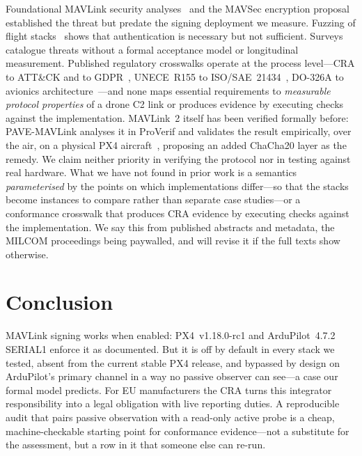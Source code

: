 \documentclass[conference]{IEEEtran}
\begin{document}
Foundational MAVLink security analyses~\cite{marty2014,kwon2018} and the MAVSec
encryption proposal~\cite{allouch2019} established the threat but predate the
signing deployment we measure. Fuzzing of flight
stacks~\cite{kim2019rvfuzzer,kim2021pgfuzz} shows that authentication is
necessary but not sufficient. Surveys~\cite{hamza2024,nassi2021} catalogue
threats without a formal acceptance model or longitudinal measurement. Published
regulatory crosswalks operate at the process level---CRA to
ATT\&CK and to GDPR~\cite{ruohonen2025sok,ruohonen2025gdpr}, UNECE~R155 to
ISO/SAE~21434~\cite{costantino2022r155}, DO-326A to avionics
architecture~\cite{siddiqui2023do326a}---and none maps essential requirements to
\emph{measurable protocol properties} of a drone C2 link or produces evidence by
executing checks against the implementation. MAVLink~2 itself has been verified
formally before: PAVE-MAVLink analyses it in ProVerif and validates the result
empirically, over the air, on a physical PX4
aircraft~\cite{wray2025pave,wray2025pavedemo}, proposing an added ChaCha20 layer
as the remedy. We claim neither priority in verifying the protocol nor in testing
against real hardware. What we have not found in prior work is a semantics
\emph{parameterised} by the points on which implementations differ---so that the
stacks become instances to compare rather than separate case studies---or a
conformance crosswalk that produces CRA evidence by executing checks against the
implementation. We say this from published abstracts and metadata, the MILCOM
proceedings being paywalled, and will revise it if the full texts show
otherwise.

\section{Conclusion}
\label{sec:conclusion}

MAVLink signing works when enabled: PX4~v1.18.0-rc1 and ArduPilot~4.7.2 SERIAL1
enforce it as documented. But it is off by default in every stack we tested,
absent from the current stable PX4 release, and bypassed by design on
ArduPilot's primary channel in a way no passive observer can see---a case our
formal model predicts. For EU manufacturers the CRA turns this integrator
responsibility into a legal obligation with live reporting duties. A reproducible
audit that pairs passive observation with a read-only active probe is a cheap,
machine-checkable starting point for conformance evidence---not a substitute
for the assessment, but a row in it that someone else can re-run.
\end{document}
